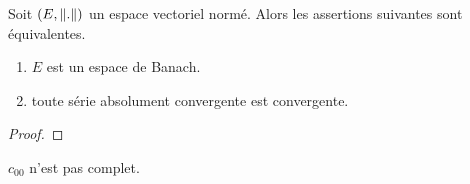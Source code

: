 \begin{proposition}
	Soit $(E, \norm{.})$ un espace vectoriel normé.
	Alors les assertions suivantes sont équivalentes.
	\begin{enumerate}
		\item $E$ est un espace de Banach.
		\item toute série absolument convergente est convergente.
	\end{enumerate}
\end{proposition}

\ifdefined\outputproof
\begin{proof}

\end{proof}
\fi

\begin{exemple}
	$c_{00}$ n'est pas complet.
\end{exemple}

